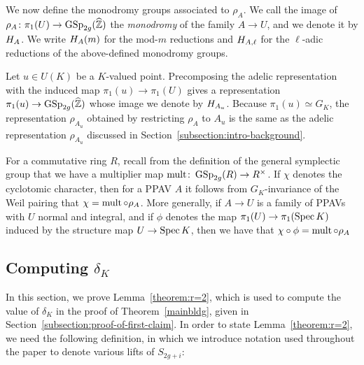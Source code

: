 We now define the monodromy groups associated to $\rho_A$. We call the image of $\rho_A \colon \pi_1(U) \to \operatorname{GSp}_{2g}(\widehat{\mathbb Z})$ the {\it monodromy} of the family $A \to U$, and we denote it by $H_A$. We write $H_A(m)$ for the mod-$m$ reductions and $H_{A,\ell}$ for the $\ell$-adic reductions of the above-defined monodromy groups.

\begin{remark}
Let $u \in U(K)$ be a $K$-valued point. Precomposing the adelic representation with the induced map $\pi_1(u) \to \pi_1(U)$ gives a representation $\pi_1(u) \to \operatorname{GSp}_{2g}(\widehat{\mathbb Z})$ whose image we denote by $H_{A_u}$. 
Because $\pi_1(u) \simeq G_K$,
the representation $\rho_{A_u}$ obtained by restricting $\rho_A$ to $A_u$
is the same as the adelic representation $\rho_{A_u}$ discussed in Section~\ref{subsection:intro-background}.
\end{remark}

\begin{remark}
	\label{remark:det-rho-is-chi}
For a commutative ring $R$, recall from the definition of the general symplectic group that we have a multiplier map $\operatorname{mult} \colon \operatorname{GSp}_{2g}(R) \to R^\times$. If $\chi$ denotes the cyclotomic character, then for a PPAV $A$ it follows from $G_K$-invariance of the Weil pairing that $\chi = \operatorname{mult} \circ \rho_{A}$.
More generally, if $A \rightarrow U$ is a family
of PPAVs with $U$ normal and integral, and if $\phi$ denotes the map $\pi_1(U) \rightarrow \pi_1(\operatorname{Spec} K)$ induced by the structure map $U \to \operatorname{Spec} K$, then we have that
$\chi \circ \phi = \operatorname{mult} \circ \rho_A$
\end{remark}

\subsection{Computing $\delta_K$}
\label{prelimswine}

In this section, we prove Lemma~\ref{theorem:r=2},
which is used to compute the value of $\delta_K$ in the
proof of Theorem~\ref{mainbldg}, given in Section~\ref{subsection:proof-of-first-claim}.
In order to state Lemma~\ref{theorem:r=2},
we need the following definition, in which
we introduce notation used throughout the paper to denote various lifts of $S_{2g+i}$:

